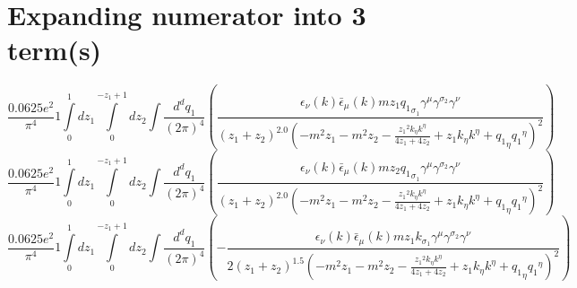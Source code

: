 \section*{Expanding numerator into 3 term(s)}
\begin{dmath}\frac{0.0625 e^{2}}{\pi^{4}}1\int\limits_{ 0 }^{ 1 } d{ z_{ 1 } }\int\limits_{ 0 }^{ - { z_{ 1 } } + 1 } d{ z_{ 2 } }\int\frac{d^d q_1 }{ (2\pi)^4 }\left(\frac{\epsilon_{ \nu }({ k }) \bar{\epsilon}_{ \mu }({ k }) m { z_{ 1 } } { { q_1 }_{ \sigma_1 } } { \gamma^{ \mu } } { \gamma^{ \sigma_2 } } { \gamma^{ \nu } }}{\left({ z_{ 1 } } + { z_{ 2 } }\right)^{2.0} \left(- m^{2} { z_{ 1 } } - m^{2} { z_{ 2 } } - \frac{{ z_{ 1 } }^{2} { { k }_{ \eta } } { { k }^{ \eta } }}{4 { z_{ 1 } } + 4 { z_{ 2 } }} + { z_{ 1 } } { { k }_{ \eta } } { { k }^{ \eta } } + { { q_1 }_{ \eta } } { { q_1 }^{ \eta } }\right)^{2}}\right)\end{dmath}
\begin{dmath}\frac{0.0625 e^{2}}{\pi^{4}}1\int\limits_{ 0 }^{ 1 } d{ z_{ 1 } }\int\limits_{ 0 }^{ - { z_{ 1 } } + 1 } d{ z_{ 2 } }\int\frac{d^d q_1 }{ (2\pi)^4 }\left(\frac{\epsilon_{ \nu }({ k }) \bar{\epsilon}_{ \mu }({ k }) m { z_{ 2 } } { { q_1 }_{ \sigma_1 } } { \gamma^{ \mu } } { \gamma^{ \sigma_2 } } { \gamma^{ \nu } }}{\left({ z_{ 1 } } + { z_{ 2 } }\right)^{2.0} \left(- m^{2} { z_{ 1 } } - m^{2} { z_{ 2 } } - \frac{{ z_{ 1 } }^{2} { { k }_{ \eta } } { { k }^{ \eta } }}{4 { z_{ 1 } } + 4 { z_{ 2 } }} + { z_{ 1 } } { { k }_{ \eta } } { { k }^{ \eta } } + { { q_1 }_{ \eta } } { { q_1 }^{ \eta } }\right)^{2}}\right)\end{dmath}
\begin{dmath}\frac{0.0625 e^{2}}{\pi^{4}}1\int\limits_{ 0 }^{ 1 } d{ z_{ 1 } }\int\limits_{ 0 }^{ - { z_{ 1 } } + 1 } d{ z_{ 2 } }\int\frac{d^d q_1 }{ (2\pi)^4 }\left(- \frac{\epsilon_{ \nu }({ k }) \bar{\epsilon}_{ \mu }({ k }) m { z_{ 1 } } { { k }_{ \sigma_1 } } { \gamma^{ \mu } } { \gamma^{ \sigma_2 } } { \gamma^{ \nu } }}{2 \left({ z_{ 1 } } + { z_{ 2 } }\right)^{1.5} \left(- m^{2} { z_{ 1 } } - m^{2} { z_{ 2 } } - \frac{{ z_{ 1 } }^{2} { { k }_{ \eta } } { { k }^{ \eta } }}{4 { z_{ 1 } } + 4 { z_{ 2 } }} + { z_{ 1 } } { { k }_{ \eta } } { { k }^{ \eta } } + { { q_1 }_{ \eta } } { { q_1 }^{ \eta } }\right)^{2}}\right)\end{dmath}
